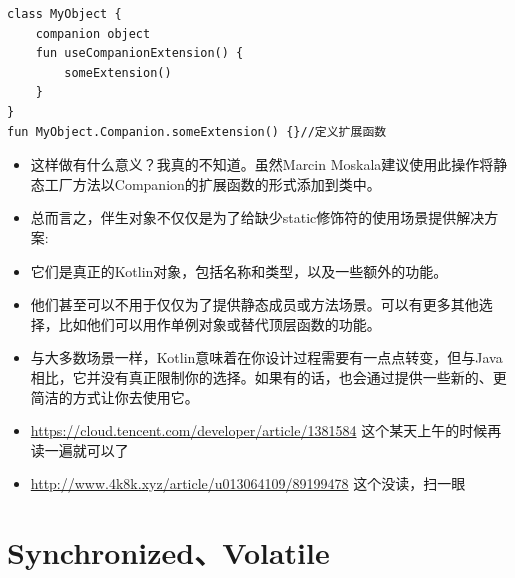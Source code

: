 \documentclass[9pt, b5paper]{article}
\begin{document}
\begin{verbatim}
class MyObject {
    companion object
    fun useCompanionExtension() {
        someExtension()
    }
}
fun MyObject.Companion.someExtension() {}//定义扩展函数
\end{verbatim}
\begin{itemize}
\item 这样做有什么意义？我真的不知道。虽然Marcin Moskala建议使用此操作将静态工厂方法以Companion的扩展函数的形式添加到类中。
\item 总而言之，伴生对象不仅仅是为了给缺少static修饰符的使用场景提供解决方案:
\item 它们是真正的Kotlin对象，包括名称和类型，以及一些额外的功能。
\item 他们甚至可以不用于仅仅为了提供静态成员或方法场景。可以有更多其他选择，比如他们可以用作单例对象或替代顶层函数的功能。
\item 与大多数场景一样，Kotlin意味着在你设计过程需要有一点点转变，但与Java相比，它并没有真正限制你的选择。如果有的话，也会通过提供一些新的、更简洁的方式让你去使用它。
\item \url{https://cloud.tencent.com/developer/article/1381584} 这个某天上午的时候再读一遍就可以了
\item \url{http://www.4k8k.xyz/article/u013064109/89199478} 这个没读，扫一眼
\end{itemize}


\section{Synchronized、Volatile}
\label{sec-5}
\end{document}
